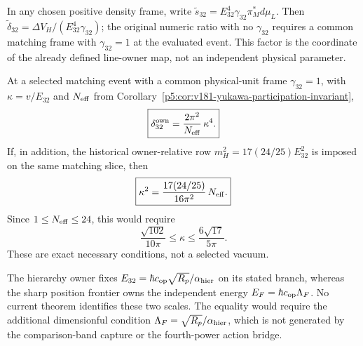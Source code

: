 \documentclass[11pt,a4paper]{article}
\begin{document}
\begin{remark}
\label{p6:rem:v382-higgs-frame-comparison}
In any chosen positive density frame, write
$\widetilde s_{32}=E_{32}^4\gamma_{32}\pi_M^*d\mu_L$.
Then $\widetilde\delta_{32}=\Delta V_H/(E_{32}^4\gamma_{32})$;
the original numeric ratio with no $\gamma_{32}$ requires a common
matching frame with $\gamma_{32}=1$ at the evaluated event.
This factor is the coordinate of the already defined line-owner map,
not an independent physical parameter.
\end{remark}

\begin{corollary}
\label{p6:cor:v181-higgs-two-coordinate-reduction}
At a selected matching event with a common physical-unit frame $\gamma_{32}=1$, with $\kappa=v/E_{32}$ and
$N_{\rm eff}$ from Corollary~\ref{p5:cor:v181-yukawa-participation-invariant},
\[
 \boxed{\delta_{32}^{\rm own}
 =\frac{2\pi^2}{N_{\rm eff}}\,\kappa^4.}
\]
If, in addition, the historical owner-relative row
$m_H^2=17(24/25)E_{32}^2$ is imposed on the same matching slice, then
\[
 \boxed{\kappa^2
 =\frac{17(24/25)}{16\pi^2}\,N_{\rm eff}.}
\]
Since $1\le N_{\rm eff}\le24$, this would require
\[
 \frac{\sqrt{102}}{10\pi}\le\kappa\le\frac{6\sqrt{17}}{5\pi}.
\]
These are exact necessary conditions, not a selected vacuum.
\end{corollary}


\begin{remark}
\label{p6:rem:v191-frontier-e32-firewall}
\leavevmode\par\noindent
The hierarchy owner fixes
$E_{32}=\hbar c_{\rm op}\sqrt{R_p}/\alpha_{\rm hier}$ on its stated branch,
whereas the sharp position frontier owns the independent energy
$E_F=\hbar c_{\rm op}\Lambda_F$.  No current theorem identifies these two
scales.  The equality would require the additional dimensionful condition
$\Lambda_F=\sqrt{R_p}/\alpha_{\rm hier}$, which is not generated by the
comparison-band capture or the fourth-power action bridge.
\end{remark}




\end{document}
